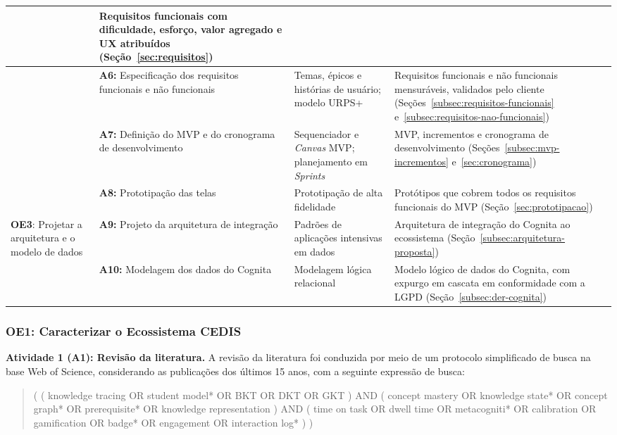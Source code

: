 {\begin{longtable}{>{\raggedright\arraybackslash}p{2.3cm}>{\raggedright\arraybackslash}p{3.7cm}>{\raggedright\arraybackslash}p{3.8cm}>{\raggedright\arraybackslash}p{4.2cm}}
& Requisitos funcionais com dificuldade, esforço, valor agregado e UX atribuídos (Seção~\ref{sec:requisitos}) \\
\cline{2-4}
& \textbf{A6:} Especificação dos requisitos funcionais e não funcionais
& Temas, épicos e histórias de usuário; modelo URPS+
& Requisitos funcionais e não funcionais mensuráveis, validados pelo cliente (Seções~\ref{subsec:requisitos-funcionais} e~\ref{subsec:requisitos-nao-funcionais}) \\
\cline{2-4}
& \textbf{A7:} Definição do MVP e do cronograma de desenvolvimento
& Sequenciador e \textit{Canvas} MVP; planejamento em \textit{Sprints}
& MVP, incrementos e cronograma de desenvolvimento (Seções~\ref{subsec:mvp-incrementos} e~\ref{sec:cronograma}) \\
\cline{2-4}
& \textbf{A8:} Prototipação das telas
& Prototipação de alta fidelidade
& Protótipos que cobrem todos os requisitos funcionais do MVP (Seção~\ref{sec:prototipacao}) \\
\hline
\textbf{OE3}: Projetar a arquitetura e o modelo de dados
& \textbf{A9:} Projeto da arquitetura de integração
& Padrões de aplicações intensivas em dados
& Arquitetura de integração do Cognita ao ecossistema (Seção~\ref{subsec:arquitetura-proposta}) \\
\cline{2-4}
& \textbf{A10:} Modelagem dos dados do Cognita
& Modelagem lógica relacional
& Modelo lógico de dados do Cognita, com expurgo em cascata em conformidade com a LGPD (Seção~\ref{subsec:der-cognita}) \\
\end{longtable}
}

\subsubsection{OE1: Caracterizar o Ecossistema CEDIS}
\label{subsubsec:oe1}

\textbf{Atividade 1 (A1): Revisão da literatura.} A revisão da literatura foi conduzida por meio de um protocolo simplificado de busca na base Web of Science, considerando as publicações dos últimos 15 anos, com a seguinte expressão de busca:

\begin{quote}
\small\ttfamily\raggedright
( ( \textquotedbl knowledge tracing\textquotedbl{} OR \textquotedbl student model*\textquotedbl{} OR \textquotedbl BKT\textquotedbl{} OR \textquotedbl DKT\textquotedbl{} OR \textquotedbl GKT\textquotedbl{} ) AND ( \textquotedbl concept mastery\textquotedbl{} OR \textquotedbl knowledge state*\textquotedbl{} OR \textquotedbl concept graph*\textquotedbl{} OR \textquotedbl prerequisite*\textquotedbl{} OR \textquotedbl knowledge representation\textquotedbl{} ) AND ( \textquotedbl time on task\textquotedbl{} OR \textquotedbl dwell time\textquotedbl{} OR \textquotedbl metacogniti*\textquotedbl{} OR \textquotedbl calibration\textquotedbl{} OR \textquotedbl gamification\textquotedbl{} OR \textquotedbl badge*\textquotedbl{} OR \textquotedbl engagement\textquotedbl{} OR \textquotedbl interaction log*\textquotedbl{} ) )
\end{quote}

